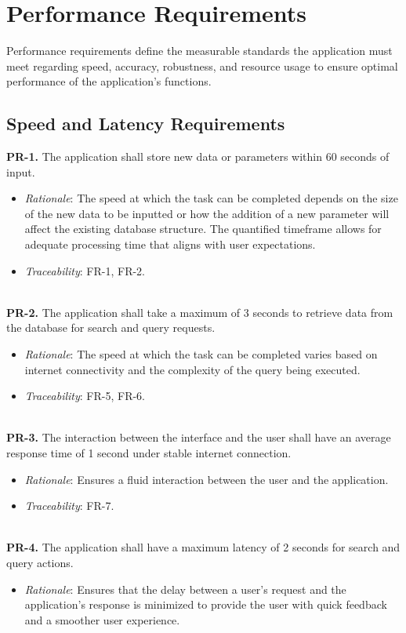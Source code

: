 \documentclass[12pt]{article}
\begin{document}
\section{Performance Requirements}
Performance requirements define the measurable standards the application must meet regarding speed, accuracy, robustness, and resource usage to ensure optimal performance of the application's functions.
\subsection{Speed and Latency Requirements}
\textbf{PR-1.} The application shall store new data or parameters within 60 seconds of input.
  \begin{itemize}
    \item \textit{Rationale}: The speed at which the task can be completed depends on the size of the new data to be inputted or how the addition of a new parameter will affect the existing database structure. The quantified timeframe allows for adequate processing time that aligns with user expectations.
    \item \textit{Traceability}: FR-1, FR-2.
  \end{itemize}
\ \\
\textbf{PR-2.} The application shall take a maximum of 3 seconds to retrieve data from the database for search and query requests.
  \begin{itemize}
    \item \textit{Rationale}: The speed at which the task can be completed varies based on internet connectivity and the complexity of the query being executed.
    \item \textit{Traceability}: FR-5, FR-6.
  \end{itemize}
\ \\
\textbf{PR-3.} The interaction between the interface and the user shall have an average response time of 1 second under stable internet connection.
  \begin{itemize}
    \item \textit{Rationale}: Ensures a fluid interaction between the user and the application.
    \item \textit{Traceability}: FR-7.
  \end{itemize}
\ \\
\textbf{PR-4.} The application shall have a maximum latency of 2 seconds for search and query actions.
  \begin{itemize}
    \item \textit{Rationale}: Ensures that the delay between a user's request and the application's response is minimized to provide the user with quick feedback and a smoother user experience.
  \end{itemize}
\end{document}
